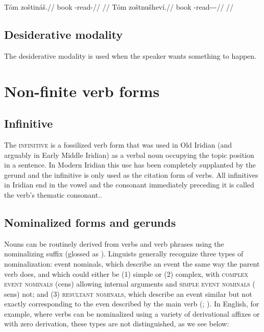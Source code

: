 \begin{multicols}{2}
  \pex
  \a
  \begingl
  \gla Tóm zoštináš.//
  \glb book \Neg{}-read-\SupN{}//
  \glft {}//
  \endgl
  \a \begingl
  \gla Tóm zoštnušheví.//
  \glb book \Neg{}-read-\Pv{}-\Deb{}-\Cont{}//
  \glft {}//
  \endgl
  \xe
\end{multicols}

\subsection{Desiderative modality}\label{sec:desiderative}

The desiderative modality is used when the speaker wants something to happen.




\section{Non-finite verb forms}

\subsection{Infinitive}\label{sec:infinitive}

The {\scshape infinitive} is a fossilized verb form that was used in Old
Iridian (and arguably in Early Middle Iridian) as a verbal noun occupying the topic position in a
sentence. In Modern Iridian this use has been completely supplanted by the
gerund and the infinitive is only used as the citation
form of verbs. All infinitives in Iridian end in the vowel
 and the consonant immediately preceding it is called the verb's
thematic consonant..

\subsection{Nominalized forms and gerunds}\label{sec:nominalized}

Nouns can be routinely derived from verbs and verb phrases using the
nominalizing suffix  (glossed as \Nz{}). Linguists generally recognize
three types of nominalization: event nominals, which describe an event the same
way the parent verb does, and which could either be (1) simple or (2) complex,
with {\scshape complex event nominals} ({\sc cen}s) allowing
internal arguments and {\scshape simple event nominals} ({\sc
sen}s) not; and (3) {\scshape resultant
nominals}, which describe an event similar
but not exactly corresponding to the even described by the main verb
(\cite{grimshaw1990}; \cite{moulton2014}). In English, for
example, where verbs can be nominalized using a variety of derivational affixes
or with zero derivation, these types are not distinguished, as we see below:

